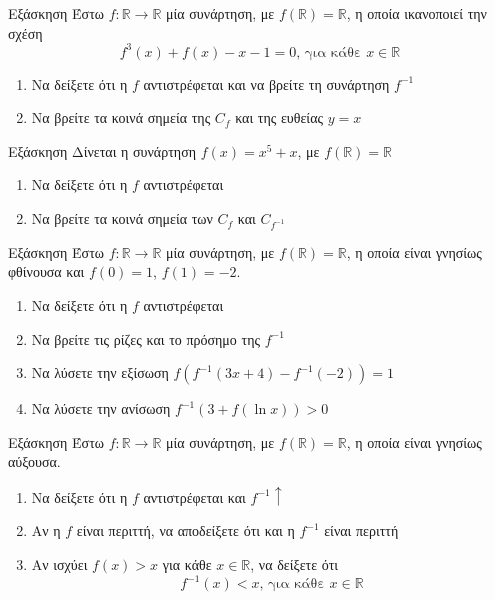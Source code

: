 \documentclass[greek]{beamer}
\begin{document}
\begin{frame}{Εξάσκηση}
  Έστω $f:\mathbb{R}\to\mathbb{R}$ μία συνάρτηση, με $f(\mathbb{R})=\mathbb{R}$, η οποία ικανοποιεί την σχέση
  $$f^3(x)+f(x)-x-1=0\text{, για κάθε }x\in \mathbb{R}$$
  \begin{enumerate}
    \item Να δείξετε ότι η $f$ αντιστρέφεται και να βρείτε τη συνάρτηση $f^{-1}$ \pause
    \item Να βρείτε τα κοινά σημεία της $C_f$ και της ευθείας $y=x$
  \end{enumerate}
\end{frame}

\begin{frame}{Εξάσκηση}
  Δίνεται η συνάρτηση $f(x)=x^5+x$, με $f(\mathbb{R})=\mathbb{R}$
  \begin{enumerate}
    \item Να δείξετε ότι η $f$ αντιστρέφεται \pause
    \item Να βρείτε τα κοινά σημεία των $C_f$ και $C_{f^{-1}}$
  \end{enumerate}
\end{frame}

\begin{frame}{Εξάσκηση}
  Έστω $f:\mathbb{R}\to\mathbb{R}$ μία συνάρτηση, με $f(\mathbb{R})=\mathbb{R}$, η οποία είναι γνησίως φθίνουσα και $f(0)=1$, $f(1)=-2$.
  \begin{enumerate}
    \item Να δείξετε ότι η $f$ αντιστρέφεται \pause
    \item Να βρείτε τις ρίζες και το πρόσημο της $f^{-1}$ \pause
    \item Να λύσετε την εξίσωση $f\left(f^{-1}(3x+4)-f^{-1}(-2)\right)=1$ \pause
    \item Να λύσετε την ανίσωση $f^{-1}\left(3+f(\ln x)\right)>0$
  \end{enumerate}
\end{frame}

\begin{frame}{Εξάσκηση}
  Έστω $f:\mathbb{R}\to\mathbb{R}$ μία συνάρτηση, με $f(\mathbb{R})=\mathbb{R}$, η οποία είναι γνησίως αύξουσα.
  \begin{enumerate}
    \item Να δείξετε ότι η $f$ αντιστρέφεται και $f^{-1}\uparrow$\pause
    \item Αν η $f$ είναι περιττή, να αποδείξετε ότι και η $f^{-1}$ είναι περιττή \pause
    \item Αν ισχύει $f(x)>x$ για κάθε $x\in\mathbb{R}$, να δείξετε ότι
          $$f^{-1}(x)<x\text{, για κάθε }x\in\mathbb{R}$$
  \end{enumerate}
\end{frame}
\end{document}
